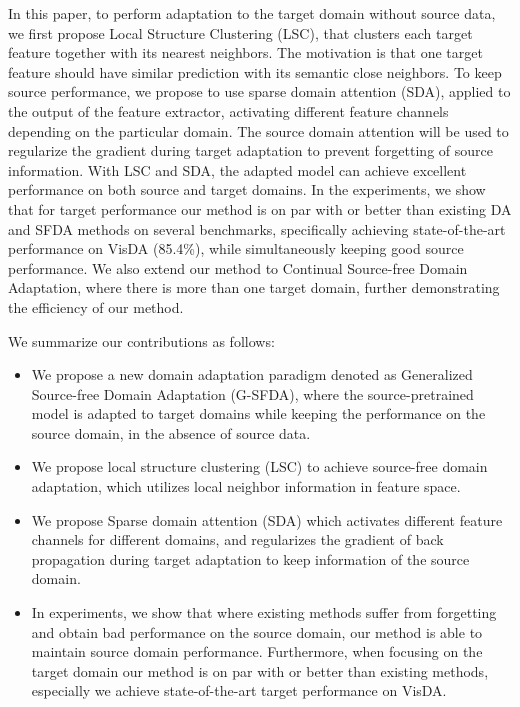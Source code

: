 \documentclass[10pt,twocolumn,letterpaper]{article}
\begin{document}
In this paper, to perform adaptation to the target domain without source data, we first propose Local Structure Clustering (LSC), that clusters each target feature together with its nearest neighbors. The motivation is that one target feature should have similar prediction with its semantic close neighbors. To keep source performance, we propose to use sparse domain attention (SDA), applied to the output of the feature extractor, activating different feature channels depending on the particular domain. The source domain attention will be used to regularize the gradient during target adaptation to prevent forgetting of source information. With LSC and SDA, the adapted model can achieve excellent performance on both source and target domains. In the experiments, we show that for target performance our method is on par with or better than existing DA and SFDA methods on several benchmarks, specifically achieving state-of-the-art performance on VisDA (85.4\%), while simultaneously keeping good source performance. We also extend our method to Continual Source-free Domain Adaptation, where there is more than one target domain, further demonstrating the efficiency of our method.

We summarize our contributions as follows:
\begin{itemize}
\vspace{-1mm}
 
\item We propose a new domain adaptation paradigm denoted as Generalized Source-free Domain Adaptation (G-SFDA), where the source-pretrained model is adapted to target domains while keeping the performance on the source domain, in the absence of source data.

\item We propose local structure clustering (LSC) to achieve source-free domain adaptation, which utilizes local neighbor information in feature space.

\item We propose Sparse domain attention (SDA) which activates different feature channels for different domains, and regularizes the gradient of back propagation during target adaptation to keep information of the source domain.

\item In experiments, we show that where existing methods suffer from forgetting and obtain bad performance on the source domain, our method is able to maintain source domain performance.
Furthermore, when focusing on the target domain our method is on par with or better than existing methods, especially we achieve state-of-the-art target performance on VisDA. 
\end{itemize}
\end{document}

